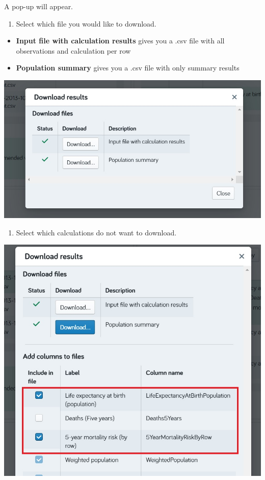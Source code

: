 \documentclass[]{book}
\providecommand{\tightlist}{%
  \setlength{\itemsep}{0pt}\setlength{\parskip}{0pt}}
\begin{document}
A pop-up will appear.

\begin{enumerate}
\def\labelenumi{\arabic{enumi}.}
\setcounter{enumi}{1}
\tightlist
\item
  Select which file you would like to download.
\end{enumerate}

\begin{itemize}
\tightlist
\item
  \textbf{Input file with calculation results} gives you a .csv file
  with all observations and calculation per row
\item
  \textbf{Population summary} gives you a .csv file with only summary
  results
\end{itemize}

\begin{center}\includegraphics{Images/Results-Download2} \end{center}

\begin{enumerate}
\def\labelenumi{\arabic{enumi}.}
\setcounter{enumi}{2}
\tightlist
\item
  Select which calculations do not want to download.
\end{enumerate}

\begin{center}\includegraphics{Images/Results-Download3} \end{center}
\end{document}
